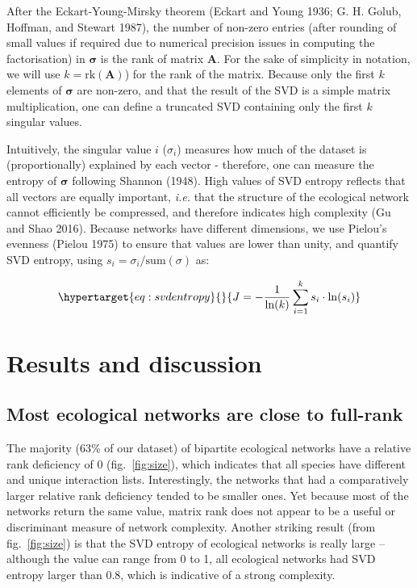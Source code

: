 \documentclass[10pt,oneside]{article}
\begin{document}
After the Eckart-Young-Mirsky theorem (Eckart and Young 1936; G. H.
Golub, Hoffman, and Stewart 1987), the number of non-zero entries (after
rounding of small values if required due to numerical precision issues
in computing the factorisation) in \(\mathbf{\sigma}\) is the rank of
matrix \(\mathbf{A}\). For the sake of simplicity in notation, we will
use \(k = \text{rk}(\mathbf{A})\)) for the rank of the matrix. Because
only the first \(k\) elements of \(\mathbf{\sigma}\) are non-zero, and
that the result of the SVD is a simple matrix multiplication, one can
define a truncated SVD containing only the first \(k\) singular values.

Intuitively, the singular value \(i\) (\(\sigma_i\)) measures how much
of the dataset is (proportionally) explained by each vector - therefore,
one can measure the entropy of \(\mathbf{\sigma}\) following Shannon
(1948). High values of SVD entropy reflects that all vectors are equally
important, \emph{i.e.} that the structure of the ecological network
cannot efficiently be compressed, and therefore indicates high
complexity (Gu and Shao 2016). Because networks have different
dimensions, we use Pielou's evenness (Pielou 1975) to ensure that values
are lower than unity, and quantify SVD entropy, using
\(s_i = \sigma_i/\text{sum}(\sigma)\) as:

\begin{equation}\protect\hypertarget{eq:svdentropy}{}{J = -\frac{1}{\ln(k)}\sum_{i=1}^k s_i\cdot\ln(s_i)}\label{eq:svdentropy}\end{equation}

\hypertarget{results-and-discussion}{%
\section{Results and discussion}\label{results-and-discussion}}

\hypertarget{most-ecological-networks-are-close-to-full-rank}{%
\subsection{Most ecological networks are close to
full-rank}\label{most-ecological-networks-are-close-to-full-rank}}

The majority (63\% of our dataset) of bipartite ecological networks have
a relative rank deficiency of 0 (fig.~\ref{fig:size}), which indicates
that all species have different and unique interaction lists.
Interestingly, the networks that had a comparatively larger relative
rank deficiency tended to be smaller ones. Yet because most of the
networks return the same value, matrix rank does not appear to be a
useful or discriminant measure of network complexity. Another striking
result (from fig.~\ref{fig:size}) is that the SVD entropy of ecological
networks is really large -- although the value can range from 0 to 1,
all ecological networks had SVD entropy larger than 0.8, which is
indicative of a strong complexity.
\end{document}
